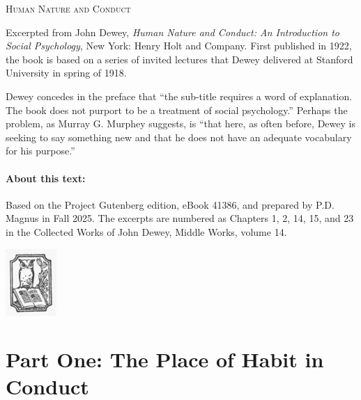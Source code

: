 \documentclass[12pt]{article}
\begin{document}
\setcounter{footnote}{0}

\setlength{\parskip}{4pt}
\setlength{\parindent}{0pt}



\centerline{
\textsc{\Large Human Nature and Conduct}
}


\bigskip



Excerpted from John Dewey, \emph{Human Nature and Conduct: An Introduction to Social Psychology}, New York: Henry Holt and Company. First published in 1922, the book is based on a series of invited lectures that Dewey delivered at Stanford University in spring of 1918.

Dewey concedes in the preface that ``the sub-title requires a word of explanation. The book does not purport to be a treatment of social psychology.'' Perhaps the problem, as Murray G. Murphey suggests, is ``that here, as often before, Dewey is seeking to say something new and that he does not have an adequate vocabulary for his purpose.''

\paragraph{About this text:}
Based on the Project Gutenberg edition, eBook 41386, and prepared by P.D. Magnus in Fall 2025. %
The excerpts are numbered as Chapters 1, 2, 14, 15, and 23 in the Collected Works of John Dewey, Middle Works, volume 14.



\centerline{\includegraphics[height=1in]{dewey-hnc-cover-owl.jpg}}




\providecommand*{\hncpage}[1]{}


\section*{Part One: The Place of Habit in Conduct}
\hncpage{14}
\end{document}
